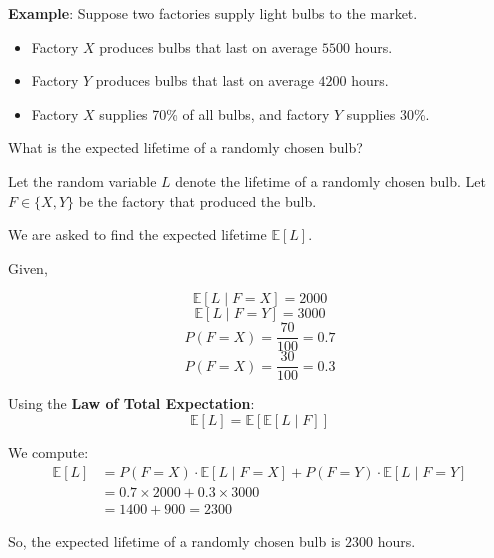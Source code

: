 \documentclass[twoside]{book}
\begin{document}
\textbf{Example}: Suppose two factories supply light bulbs to the market.

\begin{itemize}
    \item Factory \( X \) produces bulbs that last on average \( 5500 \) hours.
    \item Factory \( Y \) produces bulbs that last on average \( 4200 \) hours.
    \item Factory \( X \) supplies 70\% of all bulbs, and factory \( Y \) supplies 30\%.
\end{itemize}

What is the expected lifetime of a randomly chosen bulb?

Let the random variable \( L \) denote the lifetime of a randomly chosen bulb. Let \( F \in \{X, Y\} \) be the factory that produced the bulb.

We are asked to find the expected lifetime \( \mathbb{E}[L] \).

Given,

$$\mathbb{E}[L \mid F = X] = 2000$$
$$\mathbb{E}[L \mid F = Y] = 3000$$
$$P(F=X) = \dfrac{70}{100} = 0.7$$
$$P(F=X) = \dfrac{30}{100} = 0.3$$

Using the \textbf{Law of Total Expectation}:
\[
\mathbb{E}[L] = \mathbb{E}[\mathbb{E}[L \mid F]]
\]

We compute:
\begin{align*}
\mathbb{E}[L]
&= P(F = X) \cdot \mathbb{E}[L \mid F = X] + P(F = Y) \cdot \mathbb{E}[L \mid F = Y] \\
&= 0.7 \times 2000 + 0.3 \times 3000 \\
&= 1400 + 900 = 2300
\end{align*}

So, the expected lifetime of a randomly chosen bulb is $2300$ hours.






\end{document}
